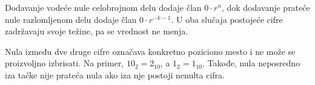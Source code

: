 
Dodavanje vodeće nule celobrojnom delu dodaje član $0\cdot r^n$, dok dodavanje prateće nule razlomljenom delu dodaje član $0\cdot r^{-k-1}$. U oba slučaja postojeće cifre zadržavaju svoje težine, pa se vrednost ne menja.

Nula između dve druge cifre označava konkretno poziciono mesto i ne može se proizvoljno izbrisati. Na primer, $10_2=2_{10}$, a $1_2=1_{10}$. Takođe, nula neposredno iza tačke nije prateća nula ako iza nje postoji nenulta cifra.
